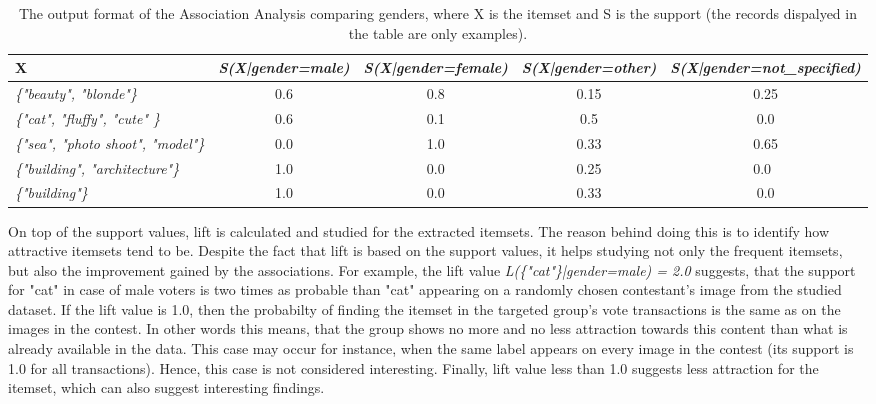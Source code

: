     \begin{table}[]
        \centering
        \begin{adjustbox}{width=1\textwidth}
            \begin{tabular}{l|c|c|c|c}
                X & \emph{S(X|gender=male)} & \emph{S(X|gender=female)} & \emph{S(X|gender=other)} & \emph{S(X|gender=not\_specified)} \\
                \hline
                \emph{\{"beauty", "blonde"\}} & 0.6 & 0.8 & 0.15 & 0.25 \\
                \emph{\{"cat", "fluffy", "cute" \}} & 0.6 & 0.1 & 0.5 & 0.0 \\
                \emph{\{"sea", "photo shoot", "model"\}} & 0.0 & 1.0 & 0.33 & 0.65 \\
                \emph{\{"building", "architecture"\}} & 1.0 & 0.0 & 0.25 & 0.0 \\
                \emph{\{"building"\}} & 1.0 & 0.0 & 0.33 & 0.0
            \end{tabular}
        \end{adjustbox}
        \caption{The output format of the Association Analysis comparing genders, where X is the itemset and S is the support (the records dispalyed in the table are only examples).}
        \label{itemset_supports_format}
    \end{table}

    On top of the support values, lift is calculated and studied for the extracted itemsets. The reason behind doing this is to identify how attractive itemsets tend to be. Despite the fact that lift is based on the support values, it helps studying not only the frequent itemsets, but also the improvement gained by the associations. For example, the lift value \emph{L(\{"cat"\}|gender=male) = 2.0} suggests, that the support for "cat" in case of male voters is two times as probable than "cat" appearing on a randomly chosen contestant's image from the studied dataset. If the lift value is 1.0, then the probabilty of finding the itemset in the targeted group's vote transactions is the same as on the images in the contest. In other words this means, that the group shows no more and no less attraction towards this content than what is already available in the data. This case may occur for instance, when the same label appears on every image in the contest (its support is 1.0 for all transactions). Hence, this case is not considered interesting. Finally, lift value less than 1.0 suggests less attraction for the itemset, which can also suggest interesting findings.

